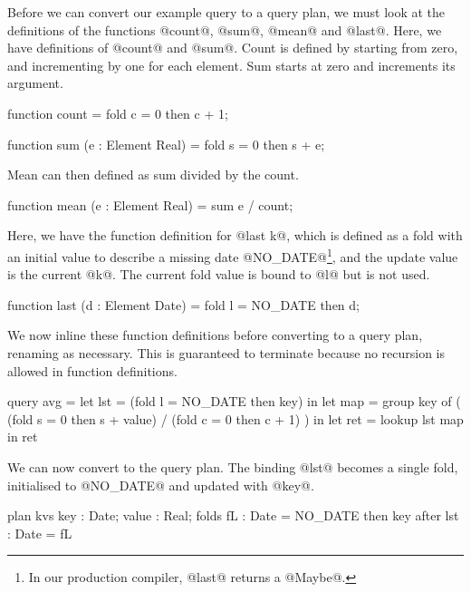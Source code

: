 Before we can convert our example query to a query plan, we must look at the definitions of the functions @count@, @sum@, @mean@ and @last@.
Here, we have definitions of @count@ and @sum@.
Count is defined by starting from zero, and incrementing by one for each element.
Sum starts at zero and increments its argument.

\begin{code}
    function count
     = fold c = 0 then c + 1;

    function sum (e : Element Real)
     = fold s = 0 then s + e;
\end{code}

Mean can then defined as sum divided by the count.
\begin{code}
    function mean (e : Element Real)
     = sum e / count;
\end{code}

Here, we have the function definition for @last k@, which is defined as a fold with an initial value to describe a missing date @NO_DATE@\footnote{In our production compiler, @last@ returns a @Maybe@.}, and the update value is the current @k@.
The current fold value is bound to @l@ but is not used.

\begin{code}
    function last (d : Element Date)
     = fold l = NO_DATE then d;
\end{code}


We now inline these function definitions before converting to a query plan, renaming as necessary.
This is guaranteed to terminate because no recursion is allowed in function definitions.
\begin{code}
  query avg
   =    let lst = (fold l = NO_DATE then key)
     in let map = group key of
                  ( (fold s = 0 then s + value)
                  / (fold c = 0 then c + 1) )
     in let ret = lookup lst map
     in     ret
\end{code}

We can now convert to the query plan.
The binding @lst@ becomes a single fold, initialised to @NO_DATE@ and updated with @key@.
\begin{code}
  plan kvs { key : Date; value : Real;      }
  folds    { fL  : Date = NO_DATE then key  }
  after    { lst : Date = fL                }
\end{code}


